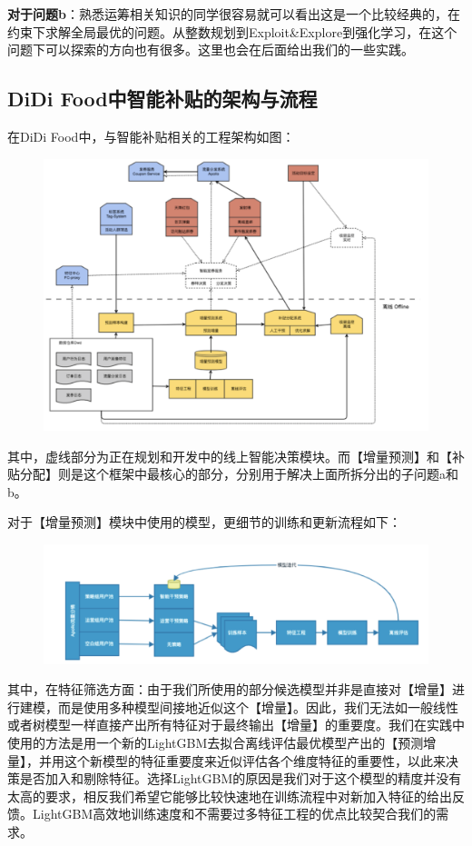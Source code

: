 \documentclass[12pt]{article}
\begin{document}
\textbf{对于问题b}：熟悉运筹相关知识的同学很容易就可以看出这是一个比较经典的，在约束下求解全局最优的问题。从整数规划到Exploit\&Explore到强化学习，在这个问题下可以探索的方向也有很多。这里也会在后面给出我们的一些实践。

\subsection{DiDi Food中智能补贴的架构与流程}
在DiDi Food中，与智能补贴相关的工程架构如图：
\begin{figure}[H]
    \centering
    \includegraphics[width=1\textwidth]{fig/Causal_Inference_In_DiDi_5.png}
\end{figure}

其中，虚线部分为正在规划和开发中的线上智能决策模块。而【增量预测】和【补贴分配】则是这个框架中最核心的部分，分别用于解决上面所拆分出的子问题a和b。

对于【增量预测】模块中使用的模型，更细节的训练和更新流程如下：
\begin{figure}[H]
    \centering
    \includegraphics[width=1\textwidth]{fig/Causal_Inference_In_DiDi_6.png}
\end{figure}

其中，在特征筛选方面：由于我们所使用的部分候选模型并非是直接对【增量】进行建模，而是使用多种模型间接地近似这个【增量】。因此，我们无法如一般线性或者树模型一样直接产出所有特征对于最终输出【增量】的重要度。我们在实践中使用的方法是用一个新的LightGBM去拟合离线评估最优模型产出的【预测增量】，并用这个新模型的特征重要度来近似评估各个维度特征的重要性，以此来决策是否加入和剔除特征。选择LightGBM的原因是我们对于这个模型的精度并没有太高的要求，相反我们希望它能够比较快速地在训练流程中对新加入特征的给出反馈。LightGBM高效地训练速度和不需要过多特征工程的优点比较契合我们的需求。
\end{document}

